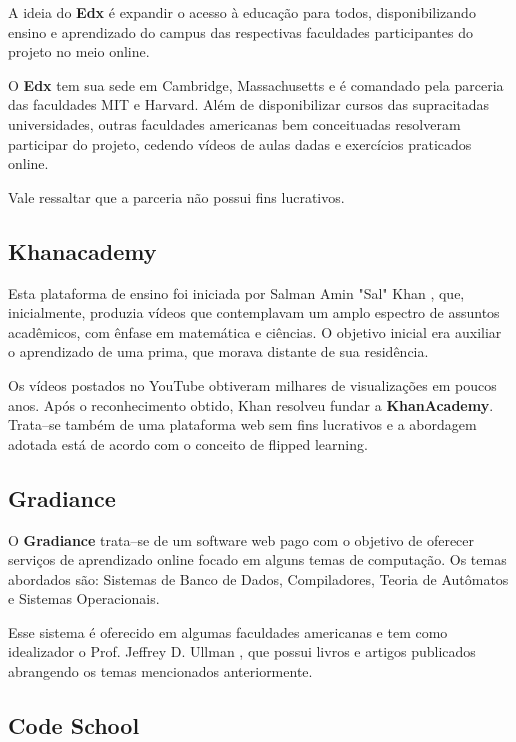 \documentclass[graduacao,brazil]{ThesisPUC}
\begin{document}
A ideia do \textbf{Edx} \'{e} expandir o acesso \`{a} educa\c{c}\~{a}o para todos,
disponibilizando ensino e aprendizado do campus das respectivas faculdades participantes
do projeto no meio online.

O \textbf{Edx} tem sua sede em Cambridge, Massachusetts e \'{e} comandado pela parceria
das faculdades MIT e Harvard. Al\'{e}m de disponibilizar cursos das supracitadas universidades,
outras faculdades americanas bem conceituadas resolveram participar do projeto, cedendo v\'{i}deos
de aulas dadas e exerc\'{i}cios praticados online.

Vale ressaltar que a parceria n\~{a}o possui fins lucrativos.

\subsection{Khanacademy}

Esta plataforma de ensino foi iniciada por Salman Amin "Sal" Khan \cite{SalmanKhan}, que, inicialmente,
produzia v\'{i}deos que contemplavam um amplo espectro de assuntos acad\^{e}micos, com \^{e}nfase em 
matem\'{a}tica e ci\^{e}ncias. O objetivo inicial era auxiliar o aprendizado de uma prima, que morava
distante de sua resid\^{e}ncia.

Os v\'{i}deos postados no YouTube obtiveram milhares de visualiza\c{c}\~{o}es em poucos anos. Ap\'{o}s o
reconhecimento obtido, Khan resolveu fundar a \textbf{KhanAcademy}. Trata--se tamb\'{e}m de uma plataforma 
web sem fins lucrativos e a abordagem adotada est\'{a} de acordo com o conceito de flipped learning.

\subsection{Gradiance}

O \textbf{Gradiance} trata--se de um software web pago com o objetivo de oferecer servi\c{c}os de aprendizado
online focado em alguns temas de computa\c{c}\~{a}o. Os temas abordados s\~{a}o: Sistemas de Banco de Dados,
Compiladores, Teoria de Aut\^{o}matos e Sistemas Operacionais.

Esse sistema \'{e} oferecido em algumas faculdades americanas e tem como idealizador o Prof. Jeffrey D. Ullman
\cite{Ullman}, que possui livros e artigos publicados abrangendo os temas mencionados anteriormente.

\subsection{Code School}
\end{document}
